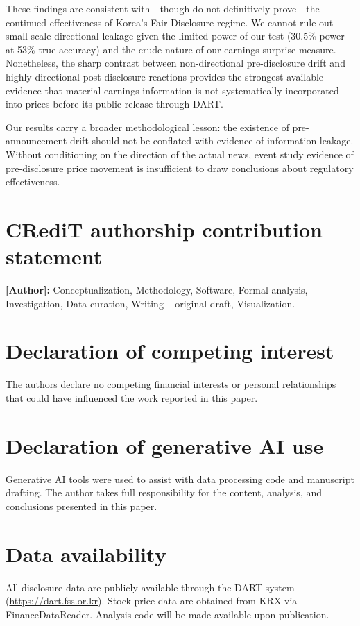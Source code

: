 \documentclass[review,authoryear]{elsarticle}
\begin{document}
These findings are consistent with---though do not definitively prove---the continued effectiveness of Korea's Fair Disclosure regime. We cannot rule out small-scale directional leakage given the limited power of our test (30.5\% power at 53\% true accuracy) and the crude nature of our earnings surprise measure. Nonetheless, the sharp contrast between non-directional pre-disclosure drift and highly directional post-disclosure reactions provides the strongest available evidence that material earnings information is not systematically incorporated into prices before its public release through DART.

Our results carry a broader methodological lesson: the existence of pre-announcement drift should not be conflated with evidence of information leakage. Without conditioning on the direction of the actual news, event study evidence of pre-disclosure price movement is insufficient to draw conclusions about regulatory effectiveness.

\section*{CRediT authorship contribution statement}
\textbf{[Author]:} Conceptualization, Methodology, Software, Formal analysis, Investigation, Data curation, Writing -- original draft, Visualization.

\section*{Declaration of competing interest}
The authors declare no competing financial interests or personal relationships that could have influenced the work reported in this paper.

\section*{Declaration of generative AI use}
Generative AI tools were used to assist with data processing code and manuscript drafting. The author takes full responsibility for the content, analysis, and conclusions presented in this paper.

\section*{Data availability}
All disclosure data are publicly available through the DART system (\url{https://dart.fss.or.kr}). Stock price data are obtained from KRX via FinanceDataReader. Analysis code will be made available upon publication.



\end{document}
